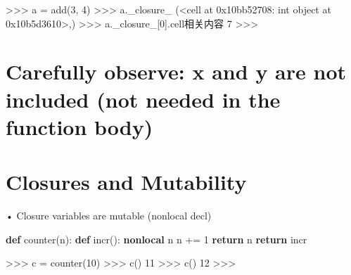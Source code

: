 \documentclass[
  letterpaper,
  DIV=11,
  numbers=noendperiod]{scrreprt}
\newenvironment{Shaded}{\begin{snugshade}}{\end{snugshade}}
\newcommand{\ControlFlowTok}[1]{\textcolor[rgb]{0.00,0.23,0.31}{\textbf{#1}}}
\newcommand{\DecValTok}[1]{\textcolor[rgb]{0.68,0.00,0.00}{#1}}
\newcommand{\KeywordTok}[1]{\textcolor[rgb]{0.00,0.23,0.31}{\textbf{#1}}}
\newcommand{\NormalTok}[1]{\textcolor[rgb]{0.00,0.23,0.31}{#1}}
\newcommand{\OperatorTok}[1]{\textcolor[rgb]{0.37,0.37,0.37}{#1}}
\begin{document}
\begin{Shaded}
\begin{Highlighting}[]
\NormalTok{\textgreater{}\textgreater{}\textgreater{} a = add(3, 4)  }
\NormalTok{\textgreater{}\textgreater{}\textgreater{} a.\_closure\_  }
\NormalTok{(\textless{}cell at 0x10bb52708: int object at 0x10b5d3610\textgreater{},)  }
\NormalTok{\textgreater{}\textgreater{}\textgreater{} a.\_closure\_[0].cell相关内容  }
\NormalTok{7  }
\NormalTok{\textgreater{}\textgreater{}\textgreater{} }
\end{Highlighting}
\end{Shaded}


\chapter{Carefully observe: x and y are not included (not needed in the
function
body)}\label{carefully-observe-x-and-y-are-not-included-not-needed-in-the-function-body}


\chapter{Closures and Mutability}\label{closures-and-mutability}

• Closure variables are mutable (nonlocal decl)

\begin{Shaded}
\begin{Highlighting}[]
\KeywordTok{def}\NormalTok{ counter(n):}
    \KeywordTok{def}\NormalTok{ incr():}
        \KeywordTok{nonlocal}\NormalTok{ n}
\NormalTok{        n }\OperatorTok{+=} \DecValTok{1}
        \ControlFlowTok{return}\NormalTok{ n}
    \ControlFlowTok{return}\NormalTok{ incr }
\end{Highlighting}
\end{Shaded}

\begin{Shaded}
\begin{Highlighting}[]
\NormalTok{\textgreater{}\textgreater{}\textgreater{} c = counter(10)  }
\NormalTok{\textgreater{}\textgreater{}\textgreater{} c()  }
\NormalTok{11  }
\NormalTok{\textgreater{}\textgreater{}\textgreater{} c()  }
\NormalTok{12  }
\NormalTok{\textgreater{}\textgreater{}\textgreater{} }
\end{Highlighting}
\end{Shaded}
\end{document}
